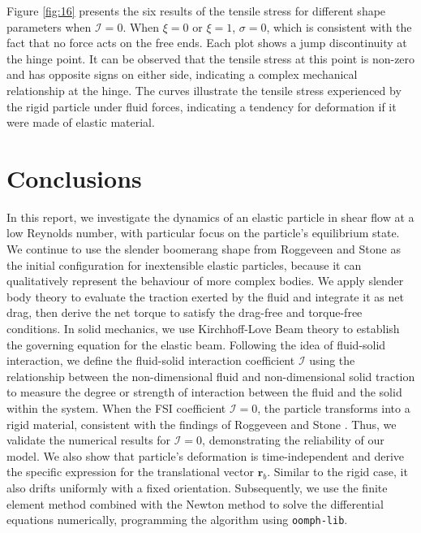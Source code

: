 \documentclass[12pt,MSc,twoside]{muthesis_2020}
\begin{document}
Figure \ref{fig:16} presents the six results of the tensile stress for different shape parameters when $\mathcal{I}=0$. When $\xi=0$ or $\xi=1$, $\sigma=0$, which is consistent with the fact that no force acts on the free ends. Each plot shows a jump discontinuity at the hinge point. It can be observed that the tensile stress at this point is non-zero and has opposite signs on either side, indicating a complex mechanical relationship at the hinge. The curves illustrate the tensile stress experienced by the rigid particle under fluid forces, indicating a tendency for deformation if it were made of elastic material. 


\chapter{Conclusions}
In this report, we investigate the dynamics of an elastic particle in shear flow at a low Reynolds number, with particular focus on the particle's equilibrium state. We continue to use the slender boomerang shape from Roggeveen and Stone \cite{roggeveen2022motion} as the initial configuration  for inextensible elastic particles, because it can qualitatively represent the behaviour of more complex bodies. We apply slender body theory to evaluate the traction exerted by the fluid and integrate it as net drag, then derive the net torque to satisfy the drag-free and torque-free conditions. In solid mechanics, we use Kirchhoff-Love Beam theory to establish the governing equation for the elastic beam. Following the idea of fluid-solid interaction, we define the fluid-solid interaction coefficient $\mathcal{I}$ using the relationship between the non-dimensional fluid and non-dimensional solid traction to measure the degree or strength of interaction between the fluid and the solid within the system. When the FSI coefficient $\mathcal{I}=0$, the particle transforms into a rigid material, consistent with the findings of Roggeveen and Stone \cite{roggeveen2022motion}. Thus, we validate the numerical results for $\mathcal{I}=0$, demonstrating the reliability of our model. We also show that particle's deformation is time-independent and derive the specific expression for the translational vector $\mathbf{r}_b$. Similar to the rigid case, it also drifts uniformly with a fixed orientation. Subsequently, we use the finite element method combined with the Newton method to solve the differential equations numerically, programming the algorithm using \texttt{oomph-lib}.
\end{document}
